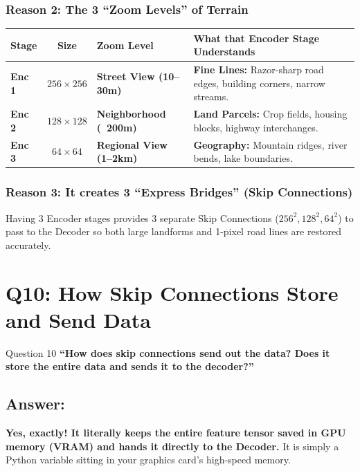 \documentclass[11pt,a4paper]{article}
\begin{document}
\subsubsection*{Reason 2: The 3 ``Zoom Levels'' of Terrain}
\begin{center}
\begin{tabularx}{\textwidth}{lclX}
\toprule
\textbf{Stage} & \textbf{Size} & \textbf{Zoom Level} & \textbf{What that Encoder Stage Understands} \\
\midrule
\textbf{Enc 1} & $256 \times 256$ & \textbf{Street View (10--30m)} & \textbf{Fine Lines:} Razor-sharp road edges, building corners, narrow streams. \\
\textbf{Enc 2} & $128 \times 128$ & \textbf{Neighborhood (~200m)} & \textbf{Land Parcels:} Crop fields, housing blocks, highway interchanges. \\
\textbf{Enc 3} & $64 \times 64$ & \textbf{Regional View (1--2km)} & \textbf{Geography:} Mountain ridges, river bends, lake boundaries. \\
\bottomrule
\end{tabularx}
\end{center}

\subsubsection*{Reason 3: It creates 3 ``Express Bridges'' (Skip Connections)}
Having 3 Encoder stages provides 3 separate Skip Connections ($256^2, 128^2, 64^2$) to pass to the Decoder so both large landforms and 1-pixel road lines are restored accurately.

\bigskip

\section{Q10: How Skip Connections Store and Send Data}

\begin{questionbox}{Question 10}
\textbf{``How does skip connections send out the data? Does it store the entire data and sends it to the decoder?''}
\end{questionbox}

\subsection*{Answer:}
\textbf{Yes, exactly! It literally keeps the entire feature tensor saved in GPU memory (VRAM) and hands it directly to the Decoder.} It is simply a Python variable sitting in your graphics card's high-speed memory.
\end{document}
